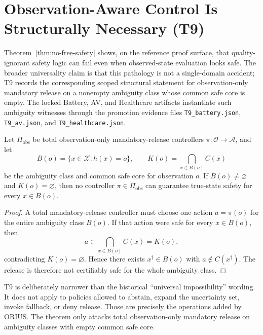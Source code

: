 \section{Observation-Aware Control Is Structurally Necessary (T9)}
\label{sec:t9-universal-impossibility}

Theorem~\ref{thm:no-free-safety} shows, on the reference proof surface, that
quality-ignorant safety logic can fail even when observed-state evaluation
looks safe.  The broader universality claim is that this pathology is not a
single-domain accident; T9 records the corresponding scoped structural
statement for observation-only mandatory release on a nonempty ambiguity class
whose common safe core is empty.  The locked Battery, AV, and Healthcare
artifacts instantiate such ambiguity witnesses through the promotion evidence
files \texttt{T9\_battery.json}, \texttt{T9\_av.json}, and
\texttt{T9\_healthcare.json}.

\begin{theorem}
\label{thm:universal-impossibility}
Let \(\Pi_{\mathrm{obs}}\) be total observation-only mandatory-release
controllers \(\pi:\mathcal O\to\mathcal A\), and let
\[
  B(o)=\{x\in\mathcal X:h(x)=o\},
  \qquad
  K(o)=\bigcap_{x\in B(o)}C(x)
\]
be the ambiguity class and common safe core for observation \(o\).  If
\(B(o)\ne\varnothing\) and \(K(o)=\varnothing\), then no controller
\(\pi\in\Pi_{\mathrm{obs}}\) can guarantee true-state safety for every
\(x\in B(o)\).
\end{theorem}

\begin{proof}
A total mandatory-release controller must choose one action \(a=\pi(o)\) for
the entire ambiguity class \(B(o)\). If that action were safe for every
\(x\in B(o)\), then
\[
  a\in\bigcap_{x\in B(o)}C(x)=K(o),
\]
contradicting \(K(o)=\varnothing\). Hence there exists
\(x^\dagger\in B(o)\) with \(a\notin C(x^\dagger)\). The release is therefore
not certifiably safe for the whole ambiguity class.
\end{proof}

\begin{remark}
T9 is deliberately narrower than the historical ``universal impossibility''
wording. It does not apply to policies allowed to abstain, expand the
uncertainty set, invoke fallback, or deny release. Those are precisely the
operations added by ORIUS. The theorem only attacks total observation-only
mandatory release on ambiguity classes with empty common safe core.
\end{remark}

